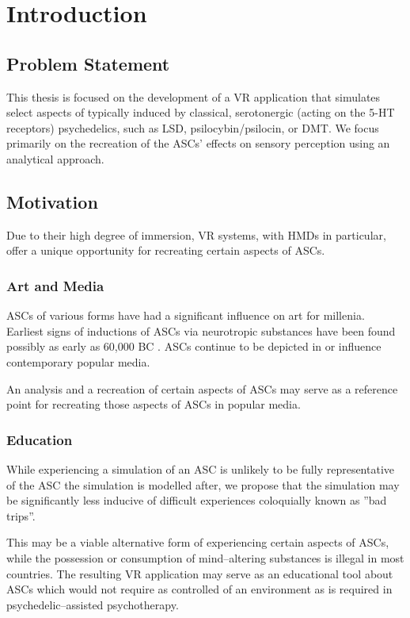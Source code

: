 \chapter{Introduction}\label{sec:introduction}

\section{Problem Statement}
This thesis is focused on the development of a \ac{VR} application that simulates select aspects of  typically induced by classical, serotonergic (acting on the \acs{5-HT} receptors) psychedelics, such as \acs{LSD}, psilocybin/psilocin, or \acs{DMT}.
We focus primarily on the recreation of the \acp{ASC}' effects on sensory perception using an analytical approach.

\section{Motivation}
Due to their high degree of immersion, \ac{VR} systems, with \acp{HMD} in particular, offer a unique opportunity for recreating certain aspects of \acp{ASC}.

\subsection{Art and Media}
\Acp{ASC} of various forms have had a significant influence on art for millenia. Earliest signs of inductions of \acp{ASC} via neurotropic substances have been found possibly as early as 60,000 BC \autocite{guerra2015psychoactive}. \Acp{ASC} continue to be depicted in or influence contemporary popular media.

An analysis and a recreation of certain aspects of \acp{ASC} may serve as a reference point for recreating those aspects of \acp{ASC} in popular media.

\subsection{Education}
While experiencing a simulation of an \ac{ASC} is unlikely to be fully representative of the \ac{ASC} the simulation is modelled after, we propose that the simulation may be significantly less inducive of difficult experiences coloquially known as ''bad trips''.

This may be a viable alternative form of experiencing certain aspects of \acp{ASC}, while the possession or consumption of mind--altering substances is illegal in most countries. The resulting \ac{VR} application may serve as an educational tool about \acp{ASC} which would not require as controlled of an environment as is required in psychedelic--assisted psychotherapy.


